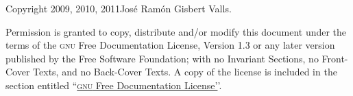 
Copyright \textcopyright{}  2009, 2010, 2011\quad José Ramón Gisbert
Valls.\vspace{2\bigskipamount}


Permission is granted to copy, distribute and/or modify this document under
the terms of the \textsc{gnu} Free Documentation License, Version 1.3 or
any later version published by the Free Software Foundation; with no
Invariant Sections, no Front-Cover Texts, and no Back-Cover Texts.  A copy
of the license is included in the section entitled
``\hyperref[chap:license]{\textsc{gnu} Free Documentation License'}'.

